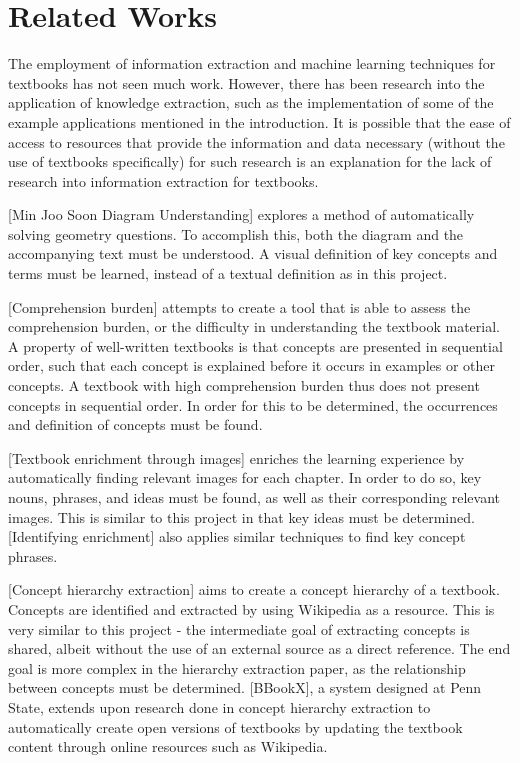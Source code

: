 \documentclass{article} %
\begin{document}
\section{Related Works}

The employment of information extraction and machine learning techniques for textbooks has not seen much work. However, there has been research into the application of knowledge extraction, such as the implementation of some of the example applications mentioned in the introduction. It is possible that the ease of access to resources that provide the information and data necessary (without the use of textbooks specifically) for such research is an explanation for the lack of research into information extraction for textbooks.

[Min Joo Soon Diagram Understanding] explores a method of automatically solving geometry questions. To accomplish this, both the diagram and the accompanying text must be understood. A visual definition of key concepts and terms must be learned, instead of a textual definition as in this project.

[Comprehension burden] attempts to create a tool that is able to assess the comprehension burden, or the difficulty in understanding the textbook material. A property of well-written textbooks is that concepts are presented in sequential order, such that each concept is explained before it occurs in examples or other concepts. A textbook with high comprehension burden thus does not present concepts in sequential order. In order for this to be determined, the occurrences and definition of concepts must be found.

[Textbook enrichment through images] enriches the learning experience by automatically finding relevant images for each chapter. In order to do so, key nouns, phrases, and ideas must be found, as well as their corresponding relevant images. This is similar to this project in that key ideas must be determined. [Identifying enrichment] also applies similar techniques to find key concept phrases.

[Concept hierarchy extraction] aims to create a concept hierarchy of a textbook. Concepts are identified and extracted by using Wikipedia as a resource. This is very similar to this project - the intermediate goal of extracting concepts is shared, albeit without the use of an external source as a direct reference. The end goal is more complex in the hierarchy extraction paper, as the relationship between concepts must be determined. [BBookX], a system designed at Penn State, extends upon research done in concept hierarchy extraction to automatically create open versions of textbooks by updating the textbook content through online resources such as Wikipedia.
\end{document}
